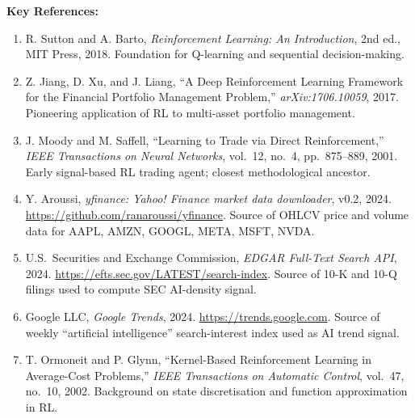 \documentclass[10pt]{article}
\begin{document}
\textbf{Key References:}
\begin{enumerate}[leftmargin=1.4em, itemsep=0.15em]
    \item R. Sutton and A. Barto, \textit{Reinforcement Learning: An Introduction}, 2nd ed., MIT Press, 2018. Foundation for Q-learning and sequential decision-making.
    \item Z. Jiang, D. Xu, and J. Liang, ``A Deep Reinforcement Learning Framework for the Financial Portfolio Management Problem,'' \textit{arXiv:1706.10059}, 2017. Pioneering application of RL to multi-asset portfolio management.
    \item J. Moody and M. Saffell, ``Learning to Trade via Direct Reinforcement,'' \textit{IEEE Transactions on Neural Networks}, vol.\ 12, no.\ 4, pp.\ 875--889, 2001. Early signal-based RL trading agent; closest methodological ancestor.
    \item Y. Aroussi, \textit{yfinance: Yahoo! Finance market data downloader}, v0.2, 2024. \url{https://github.com/ranaroussi/yfinance}. Source of OHLCV price and volume data for AAPL, AMZN, GOOGL, META, MSFT, NVDA.
    \item U.S.\ Securities and Exchange Commission, \textit{EDGAR Full-Text Search API}, 2024. \url{https://efts.sec.gov/LATEST/search-index}. Source of 10-K and 10-Q filings used to compute SEC AI-density signal.
    \item Google LLC, \textit{Google Trends}, 2024. \url{https://trends.google.com}. Source of weekly ``artificial intelligence'' search-interest index used as AI trend signal.
    \item T. Ormoneit and P. Glynn, ``Kernel-Based Reinforcement Learning in Average-Cost Problems,'' \textit{IEEE Transactions on Automatic Control}, vol.\ 47, no.\ 10, 2002. Background on state discretisation and function approximation in RL.
\end{enumerate}
\end{document}
